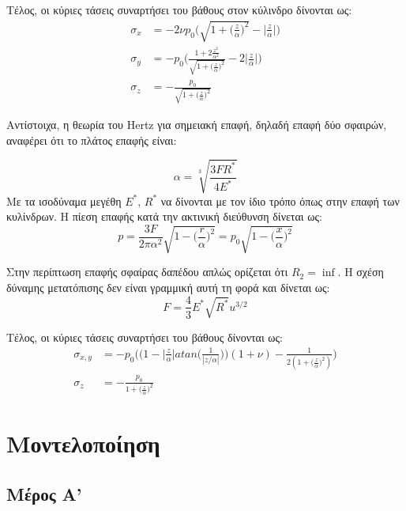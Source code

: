 \documentclass{article}
\begin{document}
Τέλος, οι κύριες τάσεις συναρτήσει του βάθους στον κύλινδρο δίνονται ως:
\begin{align}
    \sigma_x &= -2\nu p_0 \bigg(\sqrt{1 + \bigg(\frac{z}{\alpha}\bigg)^2} - \bigg|\frac{z}{\alpha}\bigg|\bigg)\\

    \sigma_y &= - p_0 \Bigg(\frac{1+2\frac{z^2}{\alpha^2}}{\sqrt{1 + \bigg(\frac{z}{\alpha}\bigg)^2}} - 2\bigg|\frac{z}{\alpha}\bigg|\Bigg)\\

    \sigma_z &= -\frac{p_0}{\sqrt{1 + \bigg(\frac{z}{\alpha}\bigg)^2}}
\end{align}



Αντίστοιχα, η θεωρία του Hertz για σημειακή επαφή, δηλαδή επαφή δύο σφαιρών,  αναφέρει ότι το πλάτος επαφής είναι:

\begin{equation}
    \alpha = \sqrt[3]{\frac{3 F R^*}{4 E^*}}
\end{equation}
Με τα ισοδύναμα μεγέθη $Ε^*$, $R^*$ να δίνονται με τον ίδιο τρόπο όπως στην επαφή των κυλίνδρων. Η πίεση επαφής κατά την ακτινική διεύθυνση δίνεται ως:
\begin{equation}
    p = \frac{3F}{2\pi \alpha^2} \sqrt{1 - \bigg(\frac{r}{\alpha}\bigg)^2} = p_0\sqrt{1 - \bigg(\frac{x}{\alpha}\bigg)^2}
\end{equation}

Στην περίπτωση επαφής σφαίρας δαπέδου απλώς ορίζεται ότι $R_2 = \inf$. Η σχέση δύναμης μετατόπισης δεν είναι γραμμική αυτή τη φορά και δίνεται ως:
\begin{equation}
    F = \frac{4}{3}E^* \sqrt{R^*} u^{3/2}
\end{equation}

Τέλος, οι κύριες τάσεις συναρτήσει του βάθους δίνονται ως:
\begin{align}
    \sigma_{x,y} &= - p_0 \bigg( \bigg(1-\bigg|\frac{z}{\alpha}\bigg| atan\bigg(\frac{1}{|z/\alpha|}\bigg)\bigg)(1+\nu)  - \frac{1}{2 (1 + \bigg(\frac{z}{\alpha}\bigg)^2)} \bigg)\\

    \sigma_z &= -\frac{p_0}{1 + \bigg(\frac{z}{\alpha}\bigg)^2}
\end{align}

\section{Μοντελοποίηση}

\subsection{Μέρος Α'}
\end{document}
